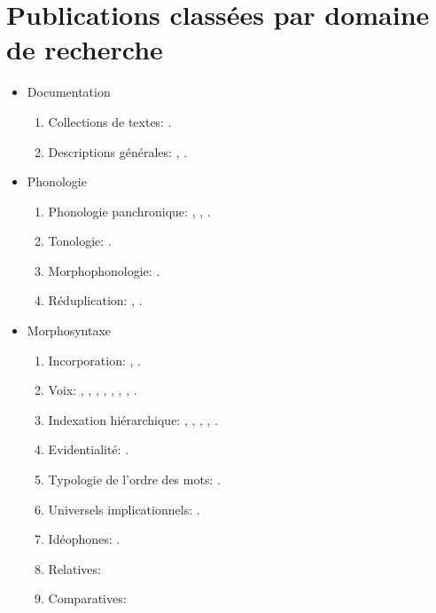 \documentclass[oldfontcommands,oneside,a4paper,11pt]{article}
\newcommand{\langue}[2]{#2}
\begin{document}
\section{\langue{By topics}{Publications classées par domaine de recherche}}
\begin{itemize}

\item  Documentation
\begin{enumerate}
\item  \langue{Text collections}{Collections de textes}: \citet{jacques10gesar}.
\item \langue{General description}{Descriptions générales}: \citet{jacques04these}, \citet{jacques08}.
\end{enumerate}


\item \langue{Phonology}{Phonologie}
\begin{enumerate}
\item  \langue{Panchronic Phonology}{Phonologie panchronique}:  \citet{jacques11lingua}, \citet{michaud-jacques12nasalite},     \citet{jacques13arapaho}.
\item   \langue{Tonology}{Tonologie}: \citet{jacques11pumi.tone}.
\item \langue{Morphophonology}{Morphophonologie}: \citet{jacques12khaling}.
\item \langue{Reduplication}{Réduplication}:  \citet{jacques04redupl},  \citet{jacques07redupl}.
\end{enumerate}

\item \langue{Morphosyntax}{Morphosyntaxe}
\begin{enumerate}
\item  Incorporation: \citet{jacques11tangut.verb}, \citet{jacques12incorp}.
\item  \langue{Voice}{Voix}:  \citet{jacques07passif}, \citet{jacques10refl}, \citet{jacques12demotion}, \citet{jacques13derivational.khaling}, \citet{jacques13tropative}, \citet{jacques14antipassive}, \citet{jacques15derivational.khaling}, \citet{jacques15causative}.
\item \langue{Hierarchical agreement}{Indexation hiérarchique}:  \citet{jacques10inverse},     \citet{jacques12khaling},   \citet{antonov14rtau}, \citet{jacques14inverse}, \citet{jacques14rtau}.
\item \langue{Evidentiality}{Evidentialité}: \citet{jacques14auditory}.
\item \langue{Word-order typology}{Typologie de l'ordre des mots}: \citet{jacques13harmonization}.
\item \langue{Implicational universals}{Universels implicationnels}: \citet{antonov14need}.
\item \langue{Ideophones}{Idéophones}: \citet{japhug14ideophones}.
\item \langue{Relativization}{Relatives}: \citet{jacques16relatives}
\item \langue{Comparative clauses}{Comparatives}: \citet{jacques15comparative}
\end{enumerate}


\end{itemize}
\end{document}
